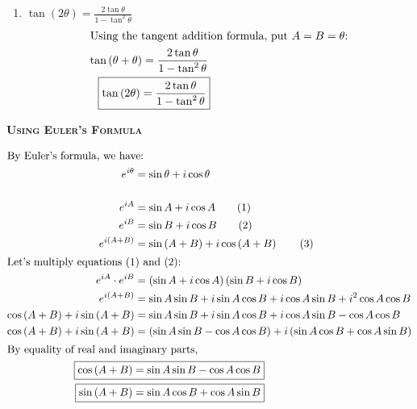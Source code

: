 \documentclass{article}
\begin{document}
\begin{enumerate}
    \item $\tan\left(2\theta\right) = \frac{2\tan \theta}{1-\tan^2 \theta}$
    \begin{align*}
        \intertext{Using the tangent addition formula, put \(A = B = \theta\):}
        \tan\left(\theta + \theta\right) &= \frac{2\tan \theta}{1-\tan^2 \theta}\\
        \Aboxed{\tan\left(2\theta\right) &= \frac{2\tan \theta}{1-\tan^2 \theta}}
    \end{align*}
\end{enumerate}



\pagebreak
\begin{center}
    \textsc{\textbf{Using Euler's Formula}}
\end{center}

\begin{center}
\end{center}

\begin{align*}
    \intertext{By Euler's formula, we have:}
    e^{i\theta} &= \sin \theta + i\cos \theta\\[5mm]
    e^{iA} &= \sin A + i\cos A \tag{1}\\
    e^{iB} &= \sin B + i\cos B \tag{2}\\
    e^{i\left(A+B\right)} &= \sin\left(A+B\right) + i\cos\left(A+B\right) \tag{3}\\  
    \intertext{Let's multiply equations (1) and (2):}
    e^{iA} \cdot e^{iB} &= \left(\sin A + i\cos A\right)\left(\sin B + i\cos B\right)\\
    e^{i\left(A+B\right)} &= \sin A\sin B + i\sin A\cos B + i\cos A\sin B + i^2\cos A\cos B\\
    \cos\left(A+B\right) + i\sin\left(A+B\right) &= \sin A\sin B + i\sin A\cos B + i\cos A\sin B - \cos A\cos B\\
    \cos\left(A+B\right) + i\sin\left(A+B\right) &= \left(\sin A\sin B - \cos A\cos B\right) + i\left(\sin A\cos B + \cos A\sin B\right)\\
    \intertext{By equality of real and imaginary parts,}
    \Aboxed{\cos\left(A+B\right) &= \sin A\sin B - \cos A\cos B}\\
    \Aboxed{\sin\left(A+B\right) &= \sin A\cos B + \cos A\sin B}
\end{align*}
\BgThispage



% 
\end{document}
